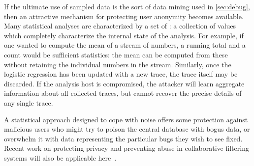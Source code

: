 If the ultimate use of sampled data is the sort of data mining used in
\autoref{sec:debug}, then an attractive mechanism for protecting user
anonymity becomes available.  Many statistical analyses are
characterized by a set of : a
collection of values which completely characterize the internal state
of the analysis.  For example, if one wanted to compute the mean of a
stream of numbers, a running total and a count would be sufficient
statistics: the mean can be computed from these without retaining the
individual numbers in the stream.  Similarly, once the logistic
regression has been updated with a new trace, the trace itself may be
discarded.  If the analysis host is compromised, the attacker will
learn aggregate information about all collected traces, but cannot
recover the precise details of any single trace.

A statistical approach designed to cope with noise offers some
protection against malicious users who might try to poison the central
database with bogus data, or overwhelm it with data representing the
particular bugs they wish to see fixed.  Recent work on protecting
privacy and preventing abuse in collaborative filtering systems will
also be applicable here~\cite{Canny2002,EC00*150}.

